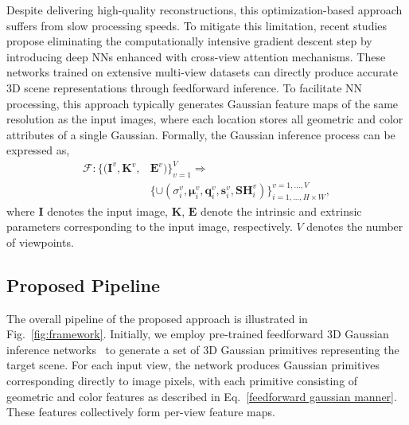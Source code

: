 \documentclass[lettersize,journal]{IEEEtran}
\begin{document}
Despite delivering high-quality reconstructions, this optimization-based approach suffers from slow processing speeds. To mitigate this limitation, recent studies propose eliminating the computationally intensive gradient descent step by introducing deep NNs enhanced with cross-view attention mechanisms. These networks trained on extensive multi-view datasets can directly produce accurate 3D scene representations through feedforward inference. To facilitate NN processing, this approach typically generates Gaussian feature maps of the same resolution as the input images, where each location stores all geometric and color attributes of a single Gaussian. Formally, the Gaussian inference process can be expressed as,
\begin{equation}
\label{feedforward gaussian manner}
    \begin{aligned}
    \mathcal{F}: \{( \boldsymbol{I}^v, \boldsymbol{K}^v,& \boldsymbol{E}^v)\}_{v=1}^V \Rightarrow \\
    &\{\cup(\sigma_i^v, \boldsymbol{\mu}_i^v, \boldsymbol{q}_i^v, \boldsymbol{s}_i^v, \boldsymbol{SH}_i^v)\}_{i=1,...,H\times W}^{v=1,...,V},
\end{aligned}
\end{equation}
where $\boldsymbol{I}$ denotes the input image, $\boldsymbol{K}$, $\boldsymbol{E}$ denote the intrinsic and extrinsic parameters corresponding to the input image, respectively. $V$ denotes the number of viewpoints.

\subsection{Proposed Pipeline}
The overall pipeline of the proposed approach is illustrated in Fig.~\ref{fig:framework}. Initially, we employ pre-trained feedforward 3D Gaussian inference networks~\cite{mvsplat, xu2024depthsplat} to generate a set of 3D Gaussian primitives representing the target scene. For each input view, the network produces Gaussian primitives corresponding directly to image pixels, with each primitive consisting of geometric and color features as described in Eq.~\ref{feedforward gaussian manner}. These features collectively form per-view feature maps.
\end{document}
